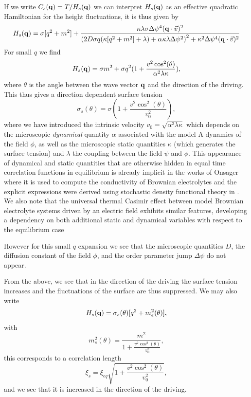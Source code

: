 If we write $C_s({\bf q})= T/H_s({\bf q})$ we can interpret $H_s({\bf q})$ as an effective quadratic Hamiltonian for the height fluctuations, it is thus given by
\begin{equation}
H_s({\bf q}) = \sigma[q^2+m^2] + \frac{\kappa\lambda\sigma \Delta\psi^4 ({\bf q}\cdot\vec{v})^2}{\left(2 D\sigma q(\kappa[q^2+m^2]+\lambda)+\alpha\kappa\lambda\Delta\psi^2\right)^2 +\kappa^2 \Delta\psi^4 ({\bf q}\cdot\vec{v})^2}
\end{equation}
For small $q$ we find 
\begin{equation}
H_s({\bf q}) = \sigma m^2 + \sigma q^2(1+ \frac{v^2\cos^2(\theta)}{\alpha^2\lambda\kappa}),
\end{equation}
where $\theta$ is the angle between the wave vector ${\bf q}$ and the direction of the driving. 
This thus gives a direction dependent surface tension 
\begin{equation}
\sigma_s(\theta) = \sigma(1+ \frac{v^2\cos^2(\theta)}{v^2_0}),
\end{equation}
where we have introduced the intrinsic velocity $v_0 = \sqrt{\alpha^2\lambda\kappa}$ which depends on the microscopic {\em dynamical} quantity $\alpha$ associated with the model A dynamics of the field $\phi$, as well as the microscopic static quantities $\kappa$ (which generates the surface tension) and $\lambda$ the coupling between the field $\psi$ and $\phi$. This appearance of dynamical and static quantities that are otherwise hidden in equal time correlation functions in equilibrium is already implicit in the works of Onsager \cite{hem1996} where it is used to compute the conductivity of Brownian electrolytes and the explicit expressions were derived using stochastic density functional theory in \cite{dem2016}. We also note that the universal thermal Casimir effect between model Brownian electrolyte systems  driven by an electric field 
exhibits similar features, developing a dependency on both additional static and dynamical variables with respect to the equilibrium case \cite{dean2016}


However for this small $q$ expansion we see that the microscopic 
quantities $D$, the diffusion constant of the field $\phi$, and the order parameter jump
$\Delta\psi$ do not appear. 

From the above, we see that  in the direction of the driving the surface tension increases and the fluctuations of the surface are thus suppressed. We may also write 
\begin{equation}
H_s({\bf q}) = \sigma_s(\theta) [q^2 + m^2_e(\theta)],
\end{equation}
with 
\begin{equation}
m^2_s(\theta) =\frac{ m^2}{1+ \frac{v^2\cos^2(\theta)}{v_0^2}},
\end{equation}
this corresponds to a correlation length 
\begin{equation}
\xi_s = \xi_{eq}\sqrt{1+ \frac{v^2\cos^2(\theta)}{v_0^2}},
\end{equation}
and we see that it is increased in the direction of the driving. 

